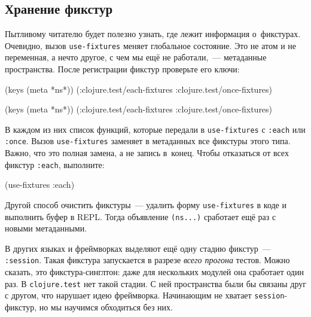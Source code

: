 \subsection{Хранение фикстур}

Пытливому читателю будет полезно узнать, где лежит информация о~фикстурах. Очевидно,
вызов \verb|use-fixtures| меняет глобальное состояние. Это не атом и не
переменная, а нечто другое, с чем мы ещё не работали,~--- метаданные
пространства. После регистрации фикстур проверьте его ключи:


\ifx\devicetype\mobile

\begin{english}
  \begin{clojure}
(keys (meta *ns*))
(:clojure.test/each-fixtures
 :clojure.test/once-fixtures)
  \end{clojure}
\end{english}

\else

\begin{english}
  \begin{clojure}
(keys (meta *ns*))
(:clojure.test/each-fixtures :clojure.test/once-fixtures)
  \end{clojure}
\end{english}

\fi

В каждом из них список функций, которые передали в \verb|use-fixtures| с
\verb|:each| или \verb|:once|. Вызов \verb|use-fixtures| заменяет в метаданных
все фикстуры этого типа. Важно, что это полная замена, а не запись
в~конец. Чтобы отказаться от всех фикстур \verb|:each|, выполните:

\begin{english}
  \begin{clojure}
(use-fixtures :each)
  \end{clojure}
\end{english}

Другой способ очистить фикстуры~--- удалить форму \verb|use-fixtures| в коде и
выполнить буфер в REPL. Тогда объявление \verb|(ns...)| сработает ещё раз с
новыми метаданными.

В других языках и фреймворках выделяют ещё одну стадию фикстур~---
\verb|:session|. Такая фикстура запускается в разрезе \emph{всего прогона}
тестов. Можно сказать, это фикстура-синглтон: даже для нескольких модулей она
сработает один раз. В \verb|clojure.test| нет такой стадии. С ней пространства
были бы связаны друг с другом, что нарушает идею фреймворка. Начинающим не
хватает \verb|session|-фикстур, но мы научимся обходиться без них.

